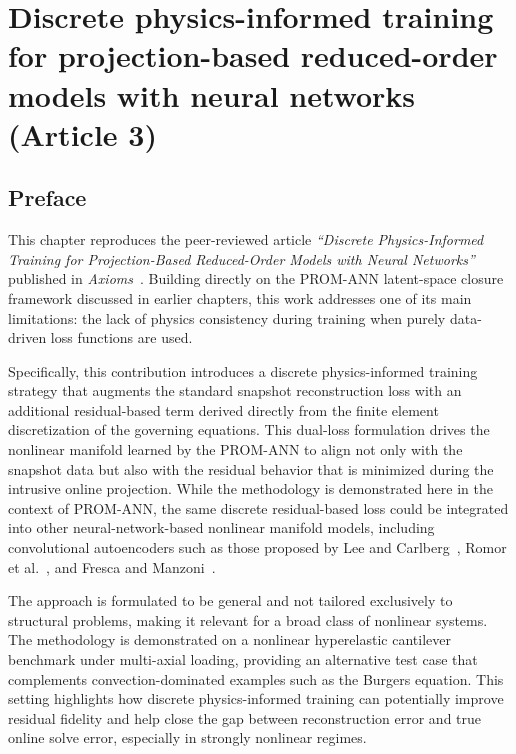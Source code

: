 \chapter{Discrete physics-informed training for projection-based reduced-order models with neural networks (Article 3)}
\label{chap:article3}

\section*{Preface}

This chapter reproduces the peer-reviewed article \textit{``Discrete Physics-Informed Training for Projection-Based Reduced-Order Models with Neural Networks''} published in \textit{Axioms}~\cite{sibuet2025discrete}. Building directly on the PROM-ANN latent-space closure framework discussed in earlier chapters, this work addresses one of its main limitations: the lack of physics consistency during training when purely data-driven loss functions are used.

Specifically, this contribution introduces a discrete physics-informed training strategy that augments the standard snapshot reconstruction loss with an additional residual-based term derived directly from the finite element discretization of the governing equations. This dual-loss formulation drives the nonlinear manifold learned by the PROM-ANN to align not only with the snapshot data but also with the residual behavior that is minimized during the intrusive online projection. While the methodology is demonstrated here in the context of PROM-ANN, the same discrete residual-based loss could be integrated into other neural-network-based nonlinear manifold models, including convolutional autoencoders such as those proposed by Lee and Carlberg~\cite{lee2020model}, Romor et al.~\cite{romor2023non}, and Fresca and Manzoni~\cite{FRESCA2022114181}.

The approach is formulated to be general and not tailored exclusively to structural problems, making it relevant for a broad class of nonlinear systems. The methodology is demonstrated on a nonlinear hyperelastic cantilever benchmark under multi-axial loading, providing an alternative test case that complements convection-dominated examples such as the Burgers equation. This setting highlights how discrete physics-informed training can potentially improve residual fidelity and help close the gap between reconstruction error and true online solve error, especially in strongly nonlinear regimes.

